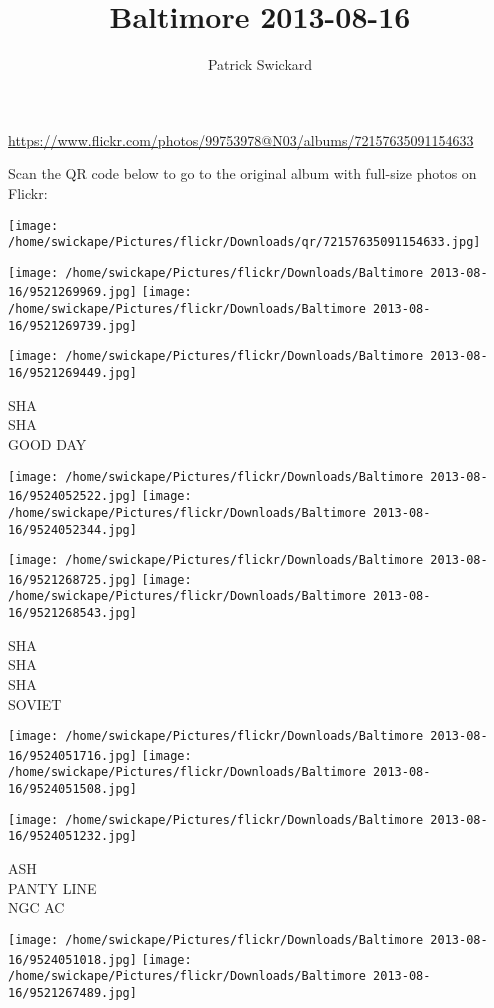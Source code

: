 \documentclass[10pt,letterpaper]{article}
\title{Baltimore 2013-08-16}
\author{Patrick Swickard}
\date{}
\begin{document}
\maketitle

\url{https://www.flickr.com/photos/99753978@N03/albums/72157635091154633}

Scan the QR code below to go to the original album with full-size photos on Flickr:

\texttt{[image: /home/swickape/Pictures/flickr/Downloads/qr/72157635091154633.jpg]}
\pagebreak

\texttt{[image: /home/swickape/Pictures/flickr/Downloads/Baltimore 2013-08-16/9521269969.jpg]}
\texttt{[image: /home/swickape/Pictures/flickr/Downloads/Baltimore 2013-08-16/9521269739.jpg]}

\vspace{0.25in}
\texttt{[image: /home/swickape/Pictures/flickr/Downloads/Baltimore 2013-08-16/9521269449.jpg]}

SHA\\
SHA\\
GOOD DAY
\pagebreak

\texttt{[image: /home/swickape/Pictures/flickr/Downloads/Baltimore 2013-08-16/9524052522.jpg]}
\texttt{[image: /home/swickape/Pictures/flickr/Downloads/Baltimore 2013-08-16/9524052344.jpg]}

\texttt{[image: /home/swickape/Pictures/flickr/Downloads/Baltimore 2013-08-16/9521268725.jpg]}
\texttt{[image: /home/swickape/Pictures/flickr/Downloads/Baltimore 2013-08-16/9521268543.jpg]}

SHA\\
SHA\\
SHA\\
SOVIET
\pagebreak

\texttt{[image: /home/swickape/Pictures/flickr/Downloads/Baltimore 2013-08-16/9524051716.jpg]}
\texttt{[image: /home/swickape/Pictures/flickr/Downloads/Baltimore 2013-08-16/9524051508.jpg]}

\vspace{0.25in}
\texttt{[image: /home/swickape/Pictures/flickr/Downloads/Baltimore 2013-08-16/9524051232.jpg]}

ASH\\
PANTY LINE\\
NGC AC
\pagebreak

\texttt{[image: /home/swickape/Pictures/flickr/Downloads/Baltimore 2013-08-16/9524051018.jpg]}
\texttt{[image: /home/swickape/Pictures/flickr/Downloads/Baltimore 2013-08-16/9521267489.jpg]}
\end{document}
